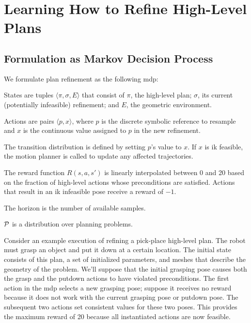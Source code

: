 \section{Learning How to Refine High-Level Plans}

\subsection{Formulation as Markov Decision Process}
We formulate plan refinement as the following {\sc mdp}:
\begin{tightlist}
\item States are tuples $\langle \pi, \sigma, E \rangle$ that consist of $\pi$, the
high-level plan; $\sigma$, its current (potentially infeasible) refinement; and $E$, the
geometric environment.
\item Actions are pairs $\langle p, x \rangle$, where $p$ is the discrete symbolic
reference to resample and $x$ is the continuous value assigned to $p$ in the new refinement.
\item The transition distribution is defined by setting $p$'s value
  to $x$. If $x$ is {\sc ik} feasible, the motion planner is called to update
  any affected trajectories.
\item The reward function $R(s, a, s')$ is linearly interpolated
  between 0 and 20 based on the fraction of high-level actions whose
  preconditions are satisfied. Actions that result in an {\sc ik}
  infeasible pose receive a reward of $-1$.
\item The horizon is the number of available samples.
\item $\mathcal{P}$ is a distribution over planning problems.
\end{tightlist}

Consider an example execution of refining a pick-place high-level plan. The
robot must grasp an object and put it down at a certain location. The
initial state consists of this plan, a set of initialized parameters,
and meshes that describe the geometry of the problem. We'll suppose
that the initial grasping pose causes both the grasp and the putdown
actions to have violated preconditions. The first action in the {\sc mdp} selects a new grasping pose;
suppose it receives no reward because it does not work with the current grasping pose or putdown pose. The subsequent
two actions set consistent values for these two poses. This provides
the maximum reward of 20 because all instantiated actions are now feasible.

